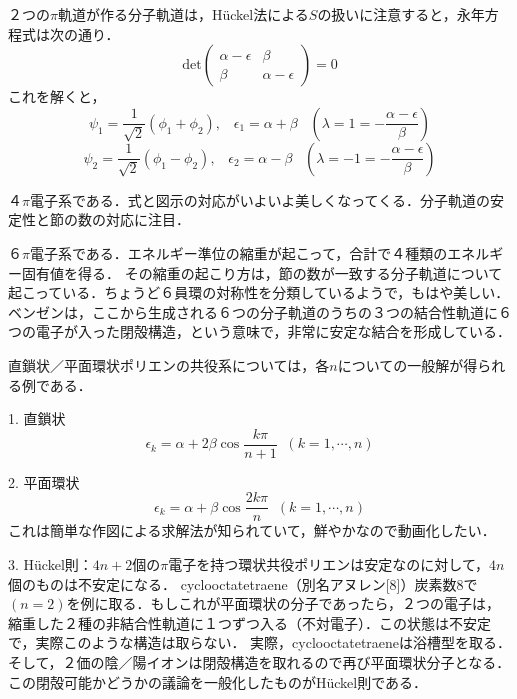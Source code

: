 \documentclass[uplatex, dvipdfmx]{jsreport}
\begin{document}
\begin{example}[エチレンの場合]
    ２つの$\pi$軌道が作る分子軌道は，Hückel法による$S$の扱いに注意すると，永年方程式は次の通り．
    \[ \mathrm{det}\left(\begin{array}{cc}\alpha-\epsilon&\beta \\ \beta&\alpha-\epsilon \end{array}\right)=0  \]
    これを解くと，
    \[ \psi_1=\frac{1}{\sqrt{2}}(\phi_1+\phi_2),\;\;\; \epsilon_1=\alpha+\beta\;\;\; (\lambda=1=-\frac{\alpha-\epsilon}{\beta}) \]
    \[ \psi_2=\frac{1}{\sqrt{2}}(\phi_1-\phi_2),\;\;\; \epsilon_2=\alpha-\beta\;\;\; (\lambda=-1=-\frac{\alpha-\epsilon}{\beta}) \]
\end{example}

\begin{example}[1,3-ブタジエンの場合]
    ４$\pi$電子系である．式と図示の対応がいよいよ美しくなってくる．分子軌道の安定性と節の数の対応に注目．
\end{example}

\begin{example}[ベンゼン環の場合]
    ６$\pi$電子系である．エネルギー準位の縮重が起こって，合計で４種類のエネルギー固有値を得る．
    その縮重の起こり方は，節の数が一致する分子軌道について起こっている．ちょうど６員環の対称性を分類しているようで，もはや美しい．
    ベンゼンは，ここから生成される６つの分子軌道のうちの３つの結合性軌道に６つの電子が入った閉殻構造，という意味で，非常に安定な結合を形成している．
\end{example}

\begin{example}[ポリエンの共役系]
    直鎖状／平面環状ポリエンの共役系については，各$n$についての一般解が得られる例である．

    1. 直鎖状
    \[ \epsilon_k=\alpha+2\beta\cos\frac{k\pi}{n+1}\;\;(k=1,\cdots,n) \]

    2. 平面環状
    \[ \epsilon_k=\alpha+\beta\cos\frac{2k\pi}{n}\;\;(k=1,\cdots,n) \]
    これは簡単な作図による求解法が知られていて，鮮やかなので動画化したい．

    3. Hückel則：$4n+2$個の$\pi$電子を持つ環状共役ポリエンは安定なのに対して，$4n$個のものは不安定になる．
    cyclooctatetraene（別名アヌレン[8]）炭素数$8$で$(n=2)$を例に取る．もしこれが平面環状の分子であったら，２つの電子は，縮重した２種の非結合性軌道に１つずつ入る（不対電子）．この状態は不安定で，実際このような構造は取らない．
    実際，cyclooctatetraeneは浴槽型を取る．そして，２価の陰／陽イオンは閉殻構造を取れるので再び平面環状分子となる．
    この閉殻可能かどうかの議論を一般化したものがHückel則である．
\end{example}
\end{document}
